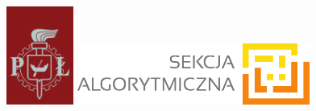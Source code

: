 \includegraphics[width=2.2cm,valign=t]{common/graphics/logo-pl}
\hfill
\includegraphics[height=2cm,valign=t]{common/graphics/logo-sekcja-r}
{
	\let\newpage\relax
	\maketitle
}

{
	\hypersetup{linkcolor=black}
	\tableofcontents
} 
